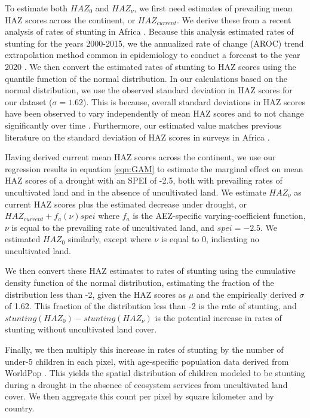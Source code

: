 \documentclass[titlepage]{article}
\begin{document}
To estimate both $HAZ_{0}$ and $HAZ_{\nu}$, we first need estimates of prevailing mean HAZ scores across the continent, or $HAZ_{current}$.  We derive these from a recent analysis of rates of stunting in Africa \citep{Osgood-Zimmerman2018}.  Because this analysis estimated rates of stunting for the years 2000-2015, we the annualized rate of change (AROC) trend extrapolation method common in epidemiology to conduct a forecast to the year 2020 \citep{Fullman2017, Osgood-Zimmerman2018}.  We then convert the estimated rates of stunting to HAZ scores using the quantile function of the normal distribution.  In our calculations based on the normal distribution, we use the observed standard deviation in HAZ scores for our dataset ($\sigma = 1.62$).  This is because, overall standard deviations in HAZ scores have been observed to vary independently of mean HAZ scores and to not change significantly over time \citep{Mei2007}.  Furthermore, our estimated value matches previous literature on the standard deviation of HAZ scores in surveys in Africa \citep{Mei2007}.

Having derived current mean HAZ scores across the continent, we use our regression results in equation \ref{eqn:GAM} to estimate the marginal effect on mean HAZ scores of a drought with an SPEI of -2.5, both with prevailing rates of uncultivated land and in the absence of uncultivated land.  We estimate $HAZ_{\nu}$ as current HAZ scores plus the estimated decrease under drought, or $HAZ_{current} + f_{a}(\nu) spei$ where $f_{a}$ is the AEZ-specific varying-coefficient function, $\nu$ is equal to the prevailing rate of uncultivated land, and $spei = -2.5$.  We estimated $HAZ_{0}$ similarly, except where $\nu$ is equal to 0, indicating no uncultivated land.

We then convert these HAZ estimates to rates of stunting using the cumulative density function of the normal distribution, estimating the fraction of the distribution less than -2, given the HAZ scores as $\mu$ and the empirically derived $\sigma$ of 1.62.  This fraction of the distribution less than -2 is the rate of stunting, and $stunting(HAZ_{0}) - stunting(HAZ_{\nu})$ is the potential increase in rates of stunting without uncultivated land cover.

Finally, we then multiply this increase in rates of stunting by the number of under-5 children in each pixel, with age-specific population data derived from WorldPop \citep{Tatem2017}.  This yields the spatial distribution of children modeled to be stunting during a drought in the absence of ecosystem services from uncultivated land cover.  We then aggregate this count per pixel by square kilometer and by country.
\end{document}
